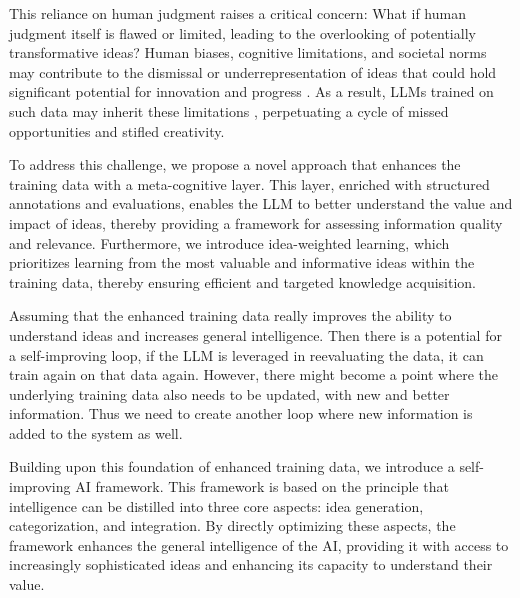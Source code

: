 \documentclass[conference]{article}
\begin{document}
	
	This reliance on human judgment raises a critical concern: What if human judgment itself is flawed or limited, leading to the overlooking of potentially transformative ideas? Human biases, cognitive limitations, and societal norms may contribute to the dismissal or underrepresentation of ideas that could hold significant potential for innovation and progress \cite{kahneman2011thinking, stanovich2000individual}. As a result, LLMs trained on such data may inherit these limitations \cite{bolukbasi2016man, caliskan2017semantics, bender2021dangers}, perpetuating a cycle of missed opportunities and stifled creativity.
	
	
	To address this challenge, we propose a novel approach that enhances the training data with a meta-cognitive layer. This layer, enriched with structured annotations and evaluations, enables the LLM to better understand the value and impact of ideas, thereby providing a framework for assessing information quality and relevance. Furthermore, we introduce idea-weighted learning, which prioritizes learning from the most valuable and informative ideas within the training data, thereby ensuring efficient and targeted knowledge acquisition.
	
	
	Assuming that the enhanced training data really improves the ability to understand ideas and increases general intelligence. Then there is a potential for a self-improving loop, if the LLM is leveraged in reevaluating the data, it can train again on that data again. However, there might become a point where the underlying training data also needs to be updated, with new and better information. Thus we need to create another loop where new information is added to the system as well. 
	
	
	Building upon this foundation of enhanced training data, we introduce a self-improving AI framework. This framework is based on the principle that intelligence can be distilled into three core aspects: idea generation, categorization, and integration. By directly optimizing these aspects, the framework enhances the general intelligence of the AI, providing it with access to increasingly sophisticated ideas and enhancing its capacity to understand their value.
	
\end{document}
